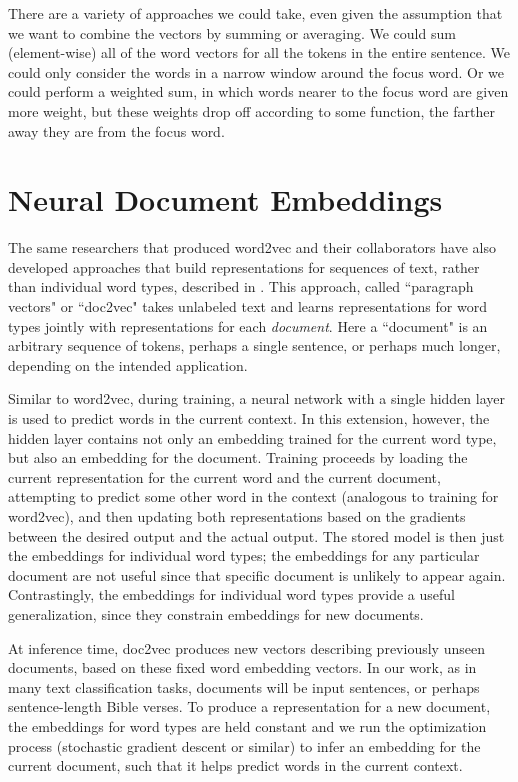 There are a variety of approaches we could take, even given the assumption that
we want to combine the vectors by summing or averaging. We could sum
(element-wise) all of the word vectors for all the tokens in the entire
sentence. We could only consider the words in a narrow window around the focus
word. Or we could perform a weighted sum, in which words nearer to the focus
word are given more weight, but these weights drop off according to some
function, the farther away they are from the focus word.


\section{Neural Document Embeddings}
The same researchers that produced word2vec and their collaborators have also
developed approaches that build representations for sequences of text, rather
than individual word types, described in
\cite{dai-document-embedding-2015,quocle-distributed-representations-2014}.
This approach, called ``paragraph vectors" or ``doc2vec" takes unlabeled text
and learns representations for word types jointly with representations for each
\emph{document}. Here a ``document" is an arbitrary sequence of tokens, perhaps
a single sentence, or perhaps much longer, depending on the intended
application.

Similar to word2vec, during training, a neural network with a single hidden
layer is used to predict words in the current context. In this extension,
however, the hidden layer contains not only an embedding trained for the
current word type, but also an embedding for the document. Training proceeds by
loading the current representation for
the current word and the current document, attempting to predict some
other word in the context (analogous to training for word2vec), and then
updating both representations based on the gradients between the desired output
and the actual output. The stored model is then just the embeddings for
individual word types; the embeddings for any particular document are not
useful since that specific document is unlikely to appear again. Contrastingly,
the embeddings for individual word types provide a useful generalization, since
they constrain embeddings for new documents.

At inference time, doc2vec produces new vectors describing previously unseen
documents, based on these fixed word embedding vectors. In our work, as in many
text classification tasks, documents will be input sentences, or perhaps
sentence-length Bible verses. To produce a representation for a new document,
the embeddings for word types are held constant and we run the optimization
process (stochastic gradient descent or similar) to infer an embedding for the
current document, such that it helps predict words in the current context.

